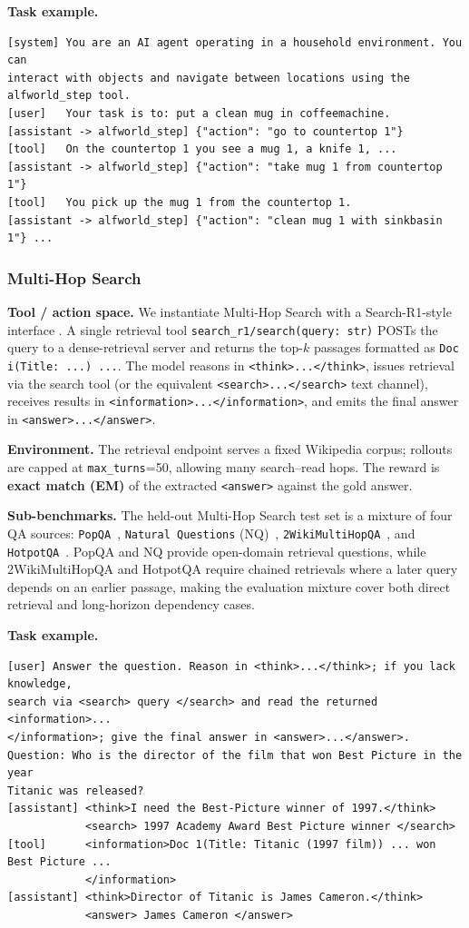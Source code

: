 \textbf{Task example.}
\begin{verbatim}
[system] You are an AI agent operating in a household environment. You can
interact with objects and navigate between locations using the alfworld_step tool.
[user]   Your task is to: put a clean mug in coffeemachine.
[assistant -> alfworld_step] {"action": "go to countertop 1"}
[tool]   On the countertop 1 you see a mug 1, a knife 1, ...
[assistant -> alfworld_step] {"action": "take mug 1 from countertop 1"}
[tool]   You pick up the mug 1 from the countertop 1.
[assistant -> alfworld_step] {"action": "clean mug 1 with sinkbasin 1"} ...
\end{verbatim}

\subsubsection{Multi-Hop Search}
\label{app:envs:searchr1}

\textbf{Tool / action space.} We instantiate Multi-Hop Search with a Search-R1-style interface \citep{jin2025searchr1}. A single retrieval tool
\texttt{search\_r1/search(query: str)} POSTs the query to a dense-retrieval server and returns the top-$k$ passages
formatted as \texttt{Doc i(Title: ...) ...}. The model
reasons in \texttt{<think>...</think>}, issues retrieval via the search tool (or the
equivalent \texttt{<search>...</search>} text channel), receives results in
\texttt{<information>...</information>}, and emits the final answer in
\texttt{<answer>...</answer>}.

\textbf{Environment.} The retrieval endpoint serves
a fixed Wikipedia corpus; rollouts are capped at \texttt{max\_turns}=50, allowing many
search--read hops. The reward is \textbf{exact match (EM)} of the extracted
\texttt{<answer>} against the gold answer.

\textbf{Sub-benchmarks.} The held-out Multi-Hop Search test set is a mixture of
four QA sources: \texttt{PopQA}~\citep{mallen2023popqa},
\texttt{Natural Questions} (NQ)~\citep{kwiatkowski2019natural},
\texttt{2WikiMultiHopQA}~\citep{ho2020twowiki}, and
\texttt{HotpotQA}~\citep{yang2018hotpotqa}. PopQA and NQ provide open-domain
retrieval questions, while 2WikiMultiHopQA and HotpotQA require chained
retrievals where a later query depends on an earlier passage, making the
evaluation mixture cover both direct retrieval and long-horizon dependency
cases.

\textbf{Task example.}
\begin{verbatim}
[user] Answer the question. Reason in <think>...</think>; if you lack knowledge,
search via <search> query </search> and read the returned <information>...
</information>; give the final answer in <answer>...</answer>.
Question: Who is the director of the film that won Best Picture in the year
Titanic was released?
[assistant] <think>I need the Best-Picture winner of 1997.</think>
            <search> 1997 Academy Award Best Picture winner </search>
[tool]      <information>Doc 1(Title: Titanic (1997 film)) ... won Best Picture ...
            </information>
[assistant] <think>Director of Titanic is James Cameron.</think>
            <answer> James Cameron </answer>
\end{verbatim}

